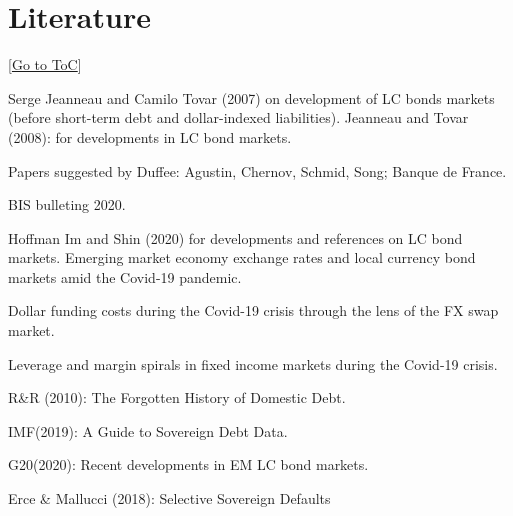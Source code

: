 \documentclass[12pt]{article}
\newcommand{\gototoc}{\vspace{-1.8cm} \null\hfill [\hyperlink{toc}{Go to ToC}] \newline}
\begin{document}
\section{Literature}
\gototoc
\begin{todolist}
	\item Serge Jeanneau and Camilo Tovar (2007) on development of LC bonds markets (before short-term debt and dollar-indexed liabilities). Jeanneau and Tovar (2008): for developments in LC bond markets.
	\item Papers suggested by Duffee: Agustin, Chernov, Schmid, Song; Banque de France.
	\item BIS bulleting 2020.
	\begin{todolist}
		\item Hoffman Im and Shin (2020) for developments and references on LC bond markets. Emerging market economy exchange rates and local currency bond markets amid the Covid-19 pandemic.
		\item Dollar funding costs during the Covid-19 crisis through the lens of the FX swap market.
		\item Leverage and margin spirals in fixed income markets during the Covid-19 crisis.
	\end{todolist}
	
	\item R\&R (2010): The Forgotten History of Domestic Debt.
	\item IMF(2019): A Guide to Sovereign Debt Data.
	\item G20(2020): Recent developments in EM LC bond markets.
	\item Erce \& Mallucci (2018): Selective Sovereign Defaults
	 \item 
\end{todolist}
\end{document}

